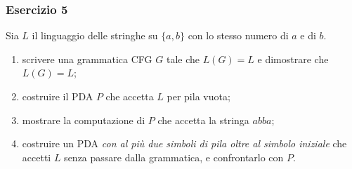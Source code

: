 \begin{frame}[fragile]
        \frametitle{Esercizio 5}
Sia $L$ il linguaggio delle stringhe su $\{a,b\}$ con lo stesso numero di $a$ e di $b$.
\begin{enumerate}
\item scrivere una grammatica CFG $G$ tale che $L(G) = L$ e dimostrare che $L(G)=L$;
\item costruire il PDA $P$ che accetta $L$ per pila vuota;
\item mostrare la computazione di $P$ che accetta la stringa $abba$;
\item costruire un PDA \emph{con al più due simboli di pila oltre al simbolo iniziale} che accetti $L$ senza passare dalla grammatica, e confrontarlo con $P$.
\end{enumerate}
\end{frame}



